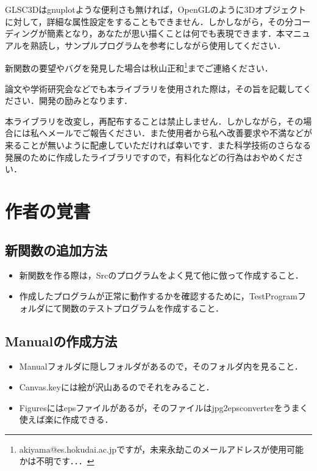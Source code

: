 \documentclass[a4paper,12pt]{jsarticle}%
\begin{document}
GLSC3Dはgnuplotような便利さも無ければ，OpenGLのように3Dオブジェクトに対して，詳細な属性設定をすることもできません．しかしながら，その分コーディングが簡素となり，あなたが思い描くことは何でも表現できます．本マニュアルを熟読し，サンプルプログラムを参考にしながら使用してください．

新関数の要望やバグを発見した場合は秋山正和\footnote{akiyama@es.hokudai.ac.jpですが，未来永劫このメールアドレスが使用可能かは不明です．．．}までご連絡ください．

論文や学術研究会などでも本ライブラリを使用された際は，その旨を記載してください．開発の励みとなります．

本ライブラリを改変し，再配布することは禁止しません．しかしながら，その場合には私へメールでご報告ください．また使用者から私へ改善要求や不満などが来ることが無いように配慮していただければ幸いです．また科学技術のさらなる発展のために作成したライブラリですので，有料化などの行為はおやめください．

\newpage
\section{作者の覚書}

\subsection{新関数の追加方法}
\begin{itemize}
 \item 新関数を作る際は，Srcのプログラムをよく見て他に倣って作成すること．
 \item 作成したプログラムが正常に動作するかを確認するために，TestProgramフォルダにて関数のテストプログラムを作成すること．
\end{itemize}

\subsection{Manualの作成方法}
\begin{itemize}
 \item Manualフォルダに隠しフォルダがあるので，そのフォルダ内を見ること．
 \item Canvas.keyには絵が沢山あるのでそれをみること．
 \item Figuresにはepsファイルがあるが，そのファイルはjpg2epsconverterをうまく使えば楽に作成できる．
\end{itemize}
\end{document}
